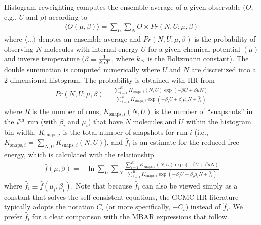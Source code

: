 \documentclass[journal=jced,manuscript=article]{achemso}
\begin{document}
Histogram reweighting computes the ensemble average of a given observable $(O$, e.g., $U$ and $\rho)$ according to
\begin{eqnarray} \label{eq: HR ave}
\langle O(\mu,\beta) \rangle = \sum_{U} \sum_{N} O \times Pr(N,U;\mu,\beta)
\end{eqnarray}
where $\langle \dots \rangle$ denotes an ensemble average and $Pr(N,U;\mu,\beta)$ is the probability of observing $N$ molecules with internal energy $U$ for a given chemical potential $(\mu)$ and inverse temperature $(\beta \equiv \frac{1}{k_{\rm B}T}$, where $k_{\rm B}$ is the Boltzmann constant). The double summation is computed numerically where $U$ and $N$ are discretized into a 2-dimensional histogram. The probability is obtained with HR from\cite{Ferrenberg1988,Ferrenberg1989}
\begin{eqnarray} \label{eq: HR prob}
Pr(N,U;\mu,\beta) = \frac{\sum_{i=1}^{R} K_{\mathrm{snaps},i}(N,U)  \exp(-\beta U + \beta \mu N)}{\sum_{i=1}^{R} K_{\mathrm{snaps}, i} \exp(-\beta_i U + \beta_i \mu_i N + \hat f_i)}
\end{eqnarray}
where $R$ is the number of runs, $K_{\mathrm{snaps},i}(N,U)$ is the number of ``snapshots'' in the $i^{\rm th}$ run (with $\beta_i$ and $\mu_i$) that have $N$ molecules and $U$ within the histogram bin width, $K_{\mathrm{snaps}, i}$ is the total number of snapshots for run $i$ (i.e., $K_{\mathrm{snaps}, i} = \sum_{N,U} K_{\mathrm{snaps},i}(N,U)$), and $\hat f_i$ is an estimate for the reduced free energy, which is calculated with the relationship
\begin{eqnarray} \label{eq: Weights}
\hat f(\mu,\beta) = - \ln \sum_{U} \sum_{N} \frac{\sum_{i=1}^{R} K_{\mathrm{snaps},i}(N,U) \exp(-\beta U + \beta \mu N)}{\sum_{i=1}^{R} K_{\mathrm{snaps}, i} \exp(-\beta_i U + \beta_i \mu_i N + \hat f_i)}
\end{eqnarray}
where $\hat f_i \equiv \hat f(\mu_i,\beta_i)$. Note that because $\hat f_i$ can also be viewed simply as a constant that solves the self-consistent equations, the GCMC-HR literature \cite{Pana2000} typically adopts the notation $C_i$ (or more specifically, $-C_i$) instead of $\hat f_i$. We prefer $\hat f_i$ for a clear comparison with the MBAR expressions that follow.
\end{document}
